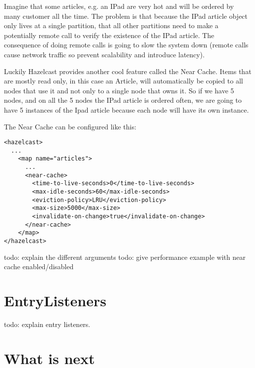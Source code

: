 Imagine that some articles, e.g. an IPad are very hot and will be ordered by many customer all the time. The problem is that because the IPad article object only lives at a single partition, that all other partitions need to make a potentially remote call to verify the existence of the IPad article. The consequence of doing remote calls is going to slow the system down (remote calls cause network traffic so prevent scalability and introduce latency).

Luckily Hazelcast provides another cool feature called the Near Cache. Items that are mostly read only, in this case an Article, will automatically be copied to all nodes that use it and not only to a single node that owns it. So if we have 5 nodes, and on all the 5 nodes the IPad article is ordered often, we are going to have 5 instances of the Ipad article because each node will have its own instance.

The Near Cache can be configured like this:
\begin{verbatim}
<hazelcast>
  ...
    <map name="articles">
      ...
      <near-cache>
        <time-to-live-seconds>0</time-to-live-seconds>
        <max-idle-seconds>60</max-idle-seconds>
        <eviction-policy>LRU</eviction-policy>
        <max-size>5000</max-size>
        <invalidate-on-change>true</invalidate-on-change>
      </near-cache>
    </map>
</hazelcast>
\end{verbatim}

todo: explain the different arguments
todo: give performance example with near cache enabled/disabled


\section{EntryListeners}

todo: explain entry listeners.

\section{What is next}
